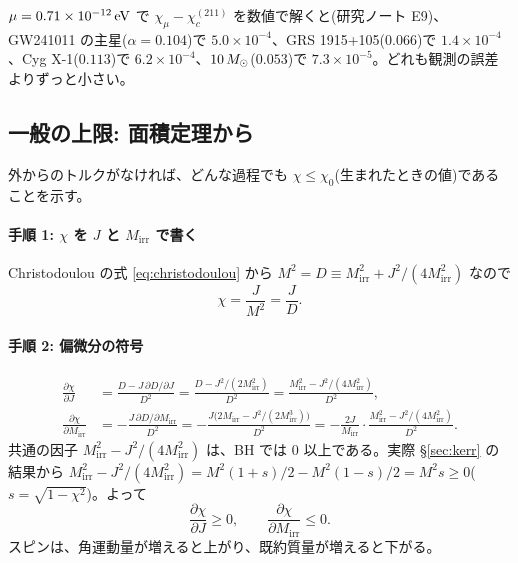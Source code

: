 \begin{numcheck}
$\mu=0.71\times10^{-12}\,\mathrm{eV}$ で $\chi_\mu-\chi_c^{(211)}$ を数値で解くと(研究ノート E9)、GW241011 の主星($\alpha=0.104$)で $5.0\times10^{-4}$、GRS 1915+105($0.066$)で $1.4\times10^{-4}$、Cyg X-1($0.113$)で $6.2\times10^{-4}$、$10\,M_\odot$($0.053$)で $7.3\times10^{-5}$。どれも観測の誤差よりずっと小さい。
\end{numcheck}

\subsection{一般の上限: 面積定理から}

外からのトルクがなければ、どんな過程でも $\chi\le\chi_0$(生まれたときの値)であることを示す。

\paragraph{手順 1: $\chi$ を $J$ と $M_\mathrm{irr}$ で書く}
Christodoulou の式 \eqref{eq:christodoulou} から $M^2=D\equiv M_\mathrm{irr}^2+J^2/(4M_\mathrm{irr}^2)$ なので
\begin{equation}
\chi=\frac{J}{M^2}=\frac{J}{D}.
\end{equation}

\paragraph{手順 2: 偏微分の符号}
\begin{align}
\frac{\partial\chi}{\partial J}&=\frac{D-J\,\partial D/\partial J}{D^2}=\frac{D-J^2/(2M_\mathrm{irr}^2)}{D^2}=\frac{M_\mathrm{irr}^2-J^2/(4M_\mathrm{irr}^2)}{D^2},\\
\frac{\partial\chi}{\partial M_\mathrm{irr}}&=-\frac{J\,\partial D/\partial M_\mathrm{irr}}{D^2}=-\frac{J\bigl(2M_\mathrm{irr}-J^2/(2M_\mathrm{irr}^3)\bigr)}{D^2}=-\frac{2J}{M_\mathrm{irr}}\cdot\frac{M_\mathrm{irr}^2-J^2/(4M_\mathrm{irr}^2)}{D^2}.
\end{align}
共通の因子 $M_\mathrm{irr}^2-J^2/(4M_\mathrm{irr}^2)$ は、BH では 0 以上である。実際 \S\ref{sec:kerr} の結果から $M_\mathrm{irr}^2-J^2/(4M_\mathrm{irr}^2)=M^2(1+s)/2-M^2(1-s)/2=M^2s\ge0$($s=\sqrt{1-\chi^2}$)。よって
\begin{equation}
\frac{\partial\chi}{\partial J}\ge0,\qquad \frac{\partial\chi}{\partial M_\mathrm{irr}}\le0.
\end{equation}
スピンは、角運動量が増えると上がり、既約質量が増えると下がる。

